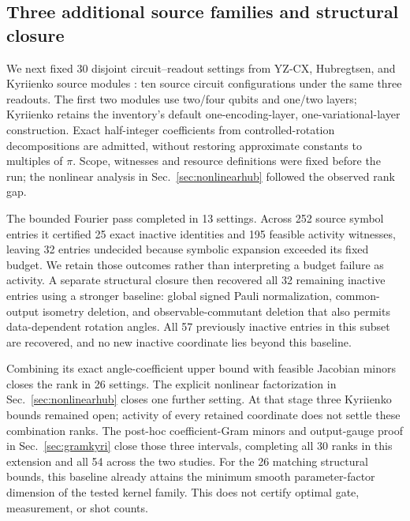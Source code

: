 \subsection{Three additional source families and structural closure}
\label{sec:extension}
We next fixed 30 disjoint circuit--readout settings from YZ-CX,
Hubregtsen, and Kyriienko source modules
\cite{squlearn,hubregtsen2022,kyriienko2021}: ten source circuit
configurations under the same three readouts. The first two modules
use two/four qubits and one/two layers; Kyriienko retains the inventory's
default one-encoding-layer, one-variational-layer construction.
Exact half-integer coefficients from controlled-rotation decompositions
are admitted, without restoring approximate constants to multiples of
$\pi$. Scope, witnesses and resource definitions were fixed before the
run; the nonlinear analysis in Sec.~\ref{sec:nonlinearhub} followed
the observed rank gap.

The bounded Fourier pass completed in 13 settings. Across 252 source
symbol entries it certified 25 exact inactive identities and 195
feasible activity witnesses, leaving 32 entries undecided because
symbolic expansion exceeded its fixed budget. We retain those outcomes
rather than interpreting a budget failure as activity. A separate
structural closure then recovered all 32 remaining inactive entries
using a stronger baseline: global signed Pauli normalization,
common-output isometry deletion, and observable-commutant deletion
that also permits data-dependent rotation angles. All 57 previously
inactive entries in this subset are recovered, and no new inactive
coordinate lies beyond this baseline.

Combining its exact angle-coefficient upper bound with feasible
Jacobian minors closes the rank in 26 settings. The explicit nonlinear
factorization in Sec.~\ref{sec:nonlinearhub} closes one further setting.
At that stage three Kyriienko bounds remained open; activity of every
retained coordinate does not settle these combination ranks. The
post-hoc coefficient-Gram minors and output-gauge proof in
Sec.~\ref{sec:gramkyri} close those three intervals, completing all
30 ranks in this extension and all 54 across the two studies.
For the 26 matching structural bounds, this baseline already attains
the minimum smooth parameter-factor dimension of the tested kernel
family. This does not certify optimal gate, measurement, or shot counts.

